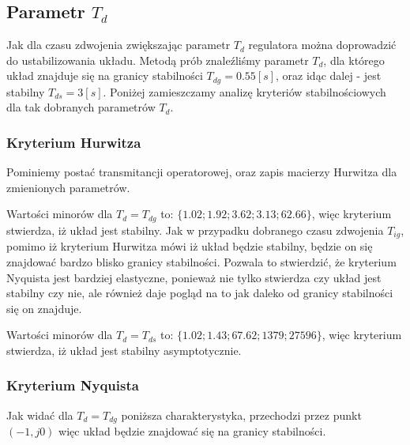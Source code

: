 \documentclass[12pt]{article}
\begin{document}
\newpage

\subsection{Parametr $T_d$}

Jak dla czasu zdwojenia zwiększając parametr $T_d$ regulatora
można doprowadzić do ustabilizowania układu. Metodą prób znaleźliśmy parametr
$T_d$, dla którego układ znajduje się na granicy stabilności $T_{dg}=0.55[s]$,
oraz idąc dalej - jest stabilny $T_{ds}=3[s]$. Poniżej zamieszczamy analizę
kryteriów stabilnościowych dla tak dobranych parametrów $T_d$.

\subsubsection{Kryterium Hurwitza}

Pominiemy postać transmitancji operatorowej, oraz zapis macierzy Hurwitza dla
zmienionych parametrów.

Wartości minorów dla $T_{d}=T_{dg}$ to: $\{1.02;1.92;3.62;3.13;62.66\}$,
więc kryterium stwierdza, iż układ jest stabilny. Jak w przypadku dobranego
czasu zdwojenia $T_{ig}$, pomimo iż kryterium Hurwitza mówi iż układ będzie
stabilny, będzie on się znajdować bardzo blisko granicy stabilności. Pozwala to
stwierdzić, że kryterium Nyquista jest bardziej elastyczne, ponieważ nie tylko
stwierdza czy układ jest stabilny czy nie, ale również daje pogląd na to jak
daleko od granicy stabilności się on znajduje.

Wartości minorów dla $T_{d}=T_{ds}$ to: $\{1.02;1.43;67.62;1379;27596\}$,
więc kryterium stwierdza, iż układ jest stabilny asymptotycznie.

\subsubsection{Kryterium Nyquista}

Jak widać dla $T_{d}=T_{dg}$ poniższa charakterystyka, przechodzi przez punkt
$(-1, j0)$ więc układ będzie znajdować się na granicy stabilności.
\end{document}
